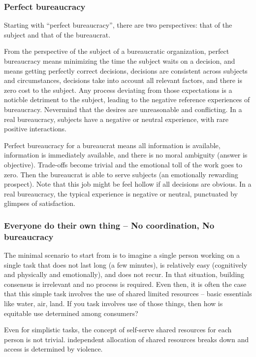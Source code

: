 \subsubsection{Perfect bureaucracy}

Starting with ``perfect bureaucracy'', there are two perspectives: that of the subject and that of the bureaucrat. 

From the perspective of the subject of a bureaucratic organization, perfect bureaucracy means minimizing the time the subject waits on a decision, and means getting perfectly correct decisions, decisions are consistent across subjects and circumstances, decisions take into account all relevant factors, and there is zero cost to the subject. Any process deviating from those expectations is a noticble detriment to the subject, leading to the negative reference experiences of bureaucracy. Nevermind that the desires are unreasonable and conflicting. In a real bureaucracy, subjects have a negative or neutral experience, with rare positive interactions.

Perfect bureaucracy for a bureaucrat means all information is available, information is immediately available, and there is no moral ambiguity (answer is objective). Trade-offs become trivial and the emotional toll of the work goes to zero. Then the bureaucrat is able to serve subjects (an emotionally rewarding prospect). Note that this job might be feel hollow if all decisions are obvious. In a real bureaucracy, the typical experience is negative or neutral, punctuated by glimpses of satisfaction. 

\subsubsection{Everyone do their own thing -- No coordination, No bureaucracy}
The minimal scenario to start from is to imagine a single person working on a single task that does not last long (a few minutes), is relatively easy (cognitively and physically and emotionally), and does not recur. In that situation, building consensus is irrelevant and no process is required. Even then, it is often the case that this simple task involves the use of shared limited resources -- basic essentials like water, air, land. If you task involves use of those things, then how is equitable use determined among consumers?

Even for simplistic tasks, the concept of self-serve shared resources for each person is not trivial. independent allocation of shared resources breaks down and access is determined by violence.

